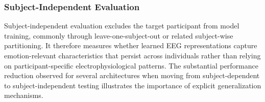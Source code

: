 \documentclass{WileyMSP-template}
\begin{document}
\subsubsection{Subject-Independent Evaluation}
\label{subsubsec:subject_independent_evaluation}

Subject-independent evaluation excludes the target participant from model training, commonly through leave-one-subject-out or related subject-wise partitioning. It therefore measures whether learned EEG representations capture emotion-relevant characteristics that persist across individuals rather than relying on participant-specific electrophysiological patterns. The substantial performance reduction observed for several architectures when moving from subject-dependent to subject-independent testing illustrates the importance of explicit generalization mechanisms.
\end{document}
